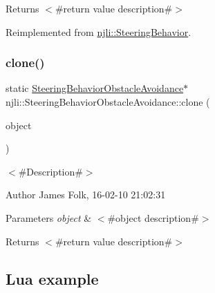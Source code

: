 \begin{DoxyReturn}{Returns}
$<$\#return value description\#$>$ 
\end{DoxyReturn}


Reimplemented from \mbox{\hyperlink{classnjli_1_1_steering_behavior_abbc461d853c1b225cfde5b79d96d11bd}{njli\+::\+Steering\+Behavior}}.

\mbox{\label{classnjli_1_1_steering_behavior_obstacle_avoidance_a6318f5b60c6217c7f40555436f452ffd}} 
\subsubsection{\texorpdfstring{clone()}{clone()}}
{\footnotesize\ttfamily static \mbox{\hyperlink{classnjli_1_1_steering_behavior_obstacle_avoidance}{Steering\+Behavior\+Obstacle\+Avoidance}}$\ast$ njli\+::\+Steering\+Behavior\+Obstacle\+Avoidance\+::clone (\begin{DoxyParamCaption}\item[{const \mbox{\hyperlink{classnjli_1_1_steering_behavior_obstacle_avoidance}{Steering\+Behavior\+Obstacle\+Avoidance}} \&}]{object }\end{DoxyParamCaption})\hspace{0.3cm}{\ttfamily [static]}}



$<$\#\+Description\#$>$ 

\begin{DoxyAuthor}{Author}
James Folk, 16-\/02-\/10 21\+:02\+:31
\end{DoxyAuthor}

\begin{DoxyParams}{Parameters}
{\em object} & $<$\#object description\#$>$\\
\hline
\end{DoxyParams}
\begin{DoxyReturn}{Returns}
$<$\#return value description\#$>$
\end{DoxyReturn}
\hypertarget{classnjli_1_1_steering_behavior_wander_ex1}{}\subsection{Lua example}\label{classnjli_1_1_steering_behavior_wander_ex1}

